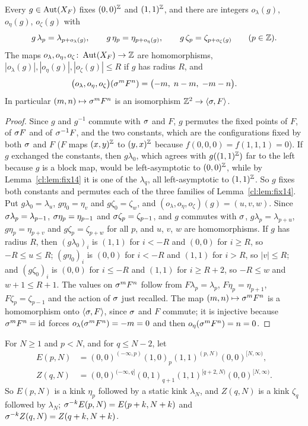\begin{proposition}\label{cl:prop:offsets14}
Every $g\in\operatorname{Aut}(X_F)$ fixes $(0,0)^{\mathbb{Z}}$ and $(1,1)^{\mathbb{Z}}$, and there are integers $o_\lambda(g)$, $o_\eta(g)$, $o_\zeta(g)$ with
\[
g\,\lambda_p=\lambda_{p+o_\lambda(g)},\qquad g\,\eta_p=\eta_{p+o_\eta(g)},\qquad g\,\zeta_p=\zeta_{p+o_\zeta(g)}\qquad(p\in\mathbb{Z}).
\]
The maps $o_\lambda,o_\eta,o_\zeta\colon\operatorname{Aut}(X_F)\to\mathbb{Z}$ are homomorphisms, $|o_\lambda(g)|,|o_\eta(g)|,|o_\zeta(g)|\le R$ if $g$ has radius $R$, and
\[
\bigl(o_\lambda,o_\eta,o_\zeta\bigr)(\sigma^mF^n)=\bigl(-m,\;n-m,\;-m-n\bigr).
\]
In particular $(m,n)\mapsto\sigma^mF^n$ is an isomorphism $\mathbb{Z}^2\to\langle\sigma,F\rangle$.
\end{proposition}

\begin{proof}
Since $g$ and $g^{-1}$ commute with $\sigma$ and $F$, $g$ permutes the fixed points of $F$, of $\sigma F$ and of $\sigma^{-1}F$, and the two constants, which are the configurations fixed by both $\sigma$ and $F$ ($F$ maps $(x,y)^{\mathbb{Z}}$ to $(y,x)^{\mathbb{Z}}$ because $f(0,0,0)=f(1,1,1)=0$). If $g$ exchanged the constants, then $g\lambda_0$, which agrees with $g((1,1)^{\mathbb{Z}})$ far to the left because $g$ is a block map, would be left-asymptotic to $(0,0)^{\mathbb{Z}}$, while by Lemma~\ref{cl:lem:fix14} it is one of the $\lambda_q$, all left-asymptotic to $(1,1)^{\mathbb{Z}}$. So $g$ fixes both constants and permutes each of the three families of Lemma~\ref{cl:lem:fix14}. Put $g\lambda_0=\lambda_u$, $g\eta_0=\eta_v$ and $g\zeta_0=\zeta_w$, and $(o_\lambda,o_\eta,o_\zeta)(g)=(u,v,w)$. Since $\sigma\lambda_p=\lambda_{p-1}$, $\sigma\eta_p=\eta_{p-1}$ and $\sigma\zeta_p=\zeta_{p-1}$, and $g$ commutes with $\sigma$, $g\lambda_p=\lambda_{p+u}$, $g\eta_p=\eta_{p+v}$ and $g\zeta_p=\zeta_{p+w}$ for all $p$, and $u$, $v$, $w$ are homomorphisms. If $g$ has radius $R$, then $(g\lambda_0)_i$ is $(1,1)$ for $i<-R$ and $(0,0)$ for $i\ge R$, so $-R\le u\le R$; $(g\eta_0)_i$ is $(0,0)$ for $i<-R$ and $(1,1)$ for $i>R$, so $|v|\le R$; and $(g\zeta_0)_i$ is $(0,0)$ for $i\le-R$ and $(1,1)$ for $i\ge R+2$, so $-R\le w$ and $w+1\le R+1$. The values on $\sigma^mF^n$ follow from $F\lambda_p=\lambda_p$, $F\eta_p=\eta_{p+1}$, $F\zeta_p=\zeta_{p-1}$ and the action of $\sigma$ just recalled. The map $(m,n)\mapsto\sigma^mF^n$ is a homomorphism onto $\langle\sigma,F\rangle$, since $\sigma$ and $F$ commute; it is injective because $\sigma^mF^n=\mathrm{id}$ forces $o_\lambda(\sigma^mF^n)=-m=0$ and then $o_\eta(\sigma^mF^n)=n=0$.
\end{proof}

For $N\ge1$ and $p<N$, and for $q\le N-2$, let
\begin{align*}
E(p,N)&=(0,0)^{(-\infty,p)}(1,0)_p(1,1)^{(p,N)}(0,0)^{[N,\infty)},\\
Z(q,N)&=(0,0)^{(-\infty,q]}(0,1)_{q+1}(1,1)^{[q+2,N)}(0,0)^{[N,\infty)}.
\end{align*}
So $E(p,N)$ is a kink $\eta_p$ followed by a static kink $\lambda_N$, and $Z(q,N)$ is a kink $\zeta_q$ followed by $\lambda_N$; $\sigma^{-k}E(p,N)=E(p+k,N+k)$ and $\sigma^{-k}Z(q,N)=Z(q+k,N+k)$.

